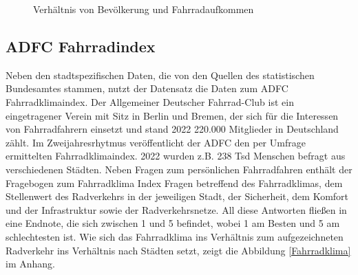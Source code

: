 \documentclass[a4paper,12pt]{thesis}
\begin{document}
\begin{figure}[!ht]%
	\centering
	\qquad
	\caption{Verhältnis von Bevölkerung und Fahrradaufkommen}%
	\label{fig:PKSundAusl}%
\end{figure}

\subsection{ADFC Fahrradindex}

Neben den stadtspezifischen Daten, die von den Quellen des statistischen Bundesamtes stammen, nutzt der Datensatz die Daten zum ADFC Fahrradklimaindex. Der Allgemeiner Deutscher Fahrrad-Club ist ein eingetragener Verein mit Sitz in Berlin und Bremen, der sich für die Interessen von Fahrradfahrern einsetzt und stand 2022 220.000 Mitglieder in Deutschland zählt. Im Zweijahresrhytmus veröffentlicht der ADFC den per Umfrage ermittelten Fahrradklimaindex. 2022 wurden z.B. 238 Tsd Menschen befragt aus verschiedenen Städten. Neben Fragen zum persönlichen Fahrradfahren enthält der Fragebogen zum Fahrradklima Index Fragen betreffend des Fahrradklimas, dem Stellenwert des Radverkehrs in der jeweiligen Stadt, der Sicherheit, dem Komfort und der Infrastruktur sowie der Radverkehrsnetze. All diese Antworten fließen in eine Endnote, die sich zwischen 1 und 5 befindet, wobei 1 am Besten und 5 am schlechtesten ist. Wie sich das Fahrradklima ins Verhältnis zum aufgezeichneten Radverkehr ins Verhältnis nach Städten setzt, zeigt die Abbildung \ref{Fahrradklima} im Anhang.
\end{document}
